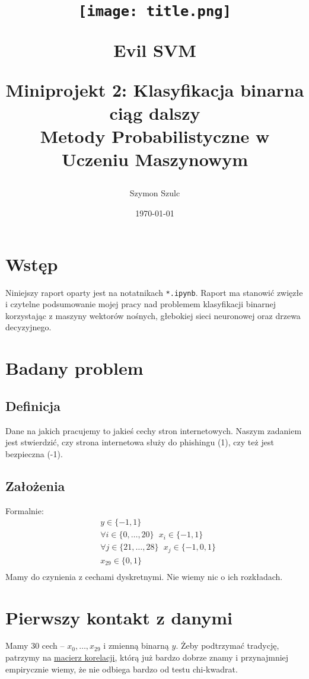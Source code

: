 \documentclass[a4paper,12pt]{article}
\title{
    \vspace{2cm} %
    \begin{figure}[h!]
        \centering
        \texttt{[image: title.png]} 
        \caption{Evil SVM}
    \end{figure}
    \vspace{1cm} %
    \textbf{\Huge Miniprojekt 2: Klasyfikacja binarna ciąg dalszy} \\
    \vspace{1cm} %
    \large Metody Probabilistyczne w Uczeniu Maszynowym \\
    \vspace{0.5cm} %
    \large \date{\today}
}
\author{Szymon Szulc}
\begin{document}
\maketitle
\thispagestyle{empty}
\newpage

\setcounter{page}{1}  %
\tableofcontents
\newpage

\section{Wstęp}
Niniejszy raport oparty jest na notatnikach \texttt{*.ipynb}. Raport ma stanowić zwięzłe i czytelne podsumowanie mojej pracy nad problemem klasyfikacji binarnej korzystając z maszyny wektorów nośnych, głebokiej sieci neuronowej oraz drzewa decyzyjnego.

\section{Badany problem}
\subsection{Definicja}
Dane na jakich pracujemy to jakieś cechy stron internetowych. Naszym zadaniem jest stwierdzić, czy strona internetowa służy do phishingu (1), czy też jest bezpieczna (-1).
\subsection{Założenia}
Formalnie:
\begin{align*}
    &y \in \{-1, 1\} \\
    &\forall i \in \{0,\dots,20\} \hspace{7pt} x_i \in \{-1, 1\} \\
    &\forall j \in \{21,\dots,28\} \hspace{7pt} x_j \in \{-1, 0, 1\} \\
    & x_{29} \in \{0, 1\} \\
\end{align*}
Mamy do czynienia z cechami dyskretnymi. Nie wiemy nic o ich rozkładach.

\section{Pierwszy kontakt z danymi}
Mamy 30 cech -- $x_0, \dots, x_{29}$ i zmienną binarną $y$. Żeby podtrzymać tradycję, patrzymy na \hyperref[fig:corr]{macierz korelacji}, którą już bardzo dobrze znamy i przynajmniej empirycznie wiemy, że nie odbiega bardzo od testu chi-kwadrat.
\end{document}
